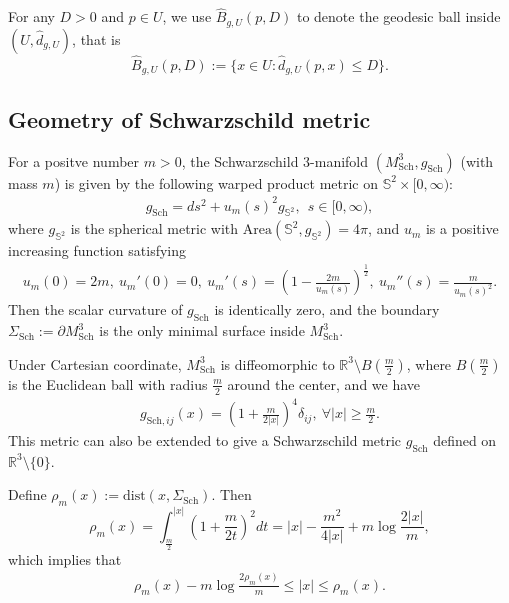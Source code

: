 \documentclass[letter]{amsart}
\theoremstyle{definition}
\theoremstyle{remark}
\begin{document}
For any $D>0$ and $p \in U$, we use $\hat{B}_{g,U}(p,D)$ to denote the geodesic ball inside $(U, \hat{d}_{g,U})$, that is
$$
\hat{B}_{g, U}(p,D) := \{ x \in U: \hat{d}_{g,U}(p,x) \leq D\} .
$$ 



\subsection{Geometry of Schwarzschild metric}

For a positve number $m>0$, the Schwarzschild $3$-manifold $(M^3_{\mathrm{Sch}}, g_{\mathrm{Sch}})$ (with mass $m$) is given by the following warped product metric on $\mathbb{S}^2 \times [0, \infty)$:
\begin{align}\label{sc-r}
g_{\mathrm{Sch}}= d s^2 + u_m(s)^2 g_{\mathbb{S}^2}, \ \ s \in [0, \infty),
\end{align} 
where $g_{\mathbb{S}^2}$ is the spherical metric with $\mathrm{Area}(\mathbb{S}^2, g_{\mathbb{S}^2}) = 4 \pi$, and $u_m$ is a positive increasing function satisfying
\begin{align}\label{u_m}
	u_m(0) = 2m,\ u_m'(0) =0,\ u_m'(s) = \left( 1- \frac{2m}{u_m(s)} \right) ^{\frac{1}{2}},\ u_m''(s) = \frac{m}{u_m(s)^2}.
\end{align}
Then the scalar curvature of $g_{\mathrm{Sch}}$ is identically zero, and the boundary $\Sigma_{\mathrm{Sch}}:= \partial M^3_{\mathrm{Sch}}$ is the only minimal surface inside $M^3_{\mathrm{Sch}}$.


Under Cartesian coordinate, $M^3_{\mathrm{Sch}}$ is diffeomorphic to $\mathbb{R}^3 \setminus B(\frac{m}{2})$, where $B(\frac{m}{2})$ is the Euclidean ball with radius $\frac{m}{2}$ around the center, and we have 
\begin{align}\label{sc-x}
	g_{\mathrm{Sch}, ij}(x) = \left( 1+ \frac{m}{2 |x|} \right) ^{4} \delta_{ij} ,\ \forall |x| \geq \frac{m}{2}.
\end{align}
This metric can also be extended to give a Schwarzschild metric $g_{\mathrm{Sch}}$ defined on $\mathbb{R}^3 \setminus \{0\} $.

Define $\rho _m(x ) := \mathrm{dist}(x , \Sigma_{\mathrm{Sch}}) $. Then 
$$
\rho _m(x) = \int_{\frac{m}{2}}^{|x|}\left( 1+ \frac{m}{2t} \right) ^2 dt = |x| - \frac{m^2}{4|x|} + m \log \frac{2|x|}{m},
$$ 
which implies that
\begin{align}\label{rho-vs-x}
\rho _m(x) - m \log \frac{2\rho _m(x)}{m} \leq |x| \leq \rho _m(x).
\end{align}
\end{document}
